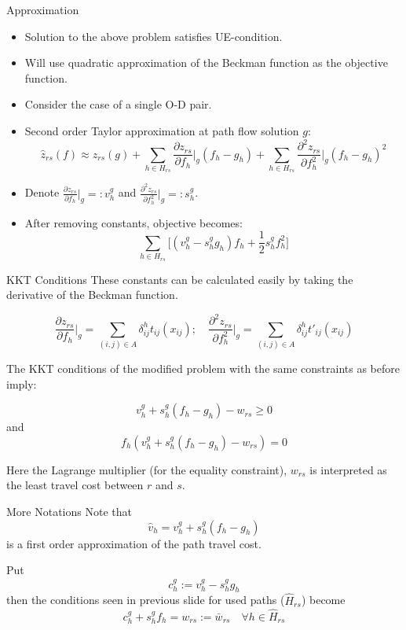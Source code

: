 \documentclass{beamer}
\begin{document}
\begin{frame}{Approximation}
\begin{itemize}
    \item Solution to the above problem satisfies
    UE-condition.
    
    \item Will use quadratic approximation of the
    Beckman function as the objective function.

    \item Consider the case of a single O-D pair.

    \item Second order Taylor approximation at path flow
    solution $g$:
    \[
        \hat{z}_{rs}(f) \approx z_{rs}(g) +
        \sum_{h\in H_{rs}}\frac{\partial z_{rs}}{\partial f_h}\bigg|_{g}
        (f_h-g_h)+
        \sum_{h\in H_{rs}} \frac{\partial ^2 z_{rs}}{\partial f_h^2}\bigg|_g(f_h-g_h)^2
    \]

    \item Denote $\frac{\partial z_{rs}}{\partial f_h}\big|_{g}=: v_h^g$ and
    $\frac{\partial ^2 z_{rs}}{\partial f_h^2}\big|_g =: s_h^g$.

    \item After removing constants, objective becomes:
    \[
        \sum_{h\in H_{rs}}\big[(v_h^g - s_h^g g_h)f_h + \frac{1}{2}
        s_h^g f_h^2\big]
    \]
\end{itemize}
\end{frame}

\begin{frame}{KKT Conditions}
These constants can be calculated easily by
taking the derivative of the Beckman function.

\[
\frac{\partial z_{rs}}{\partial f_h}\bigg|_{g}
= \sum_{(i,j)\in A}\delta_{ij}^h t_{ij}(x_{ij});\quad
\frac{\partial ^2 z_{rs}}{\partial f_h^2}\bigg|_g
= \sum_{(i,j)\in A} \delta_{ij}^h t'_{ij}(x_{ij})
\]

The KKT conditions of the modified problem with the
same constraints as before imply:

\[v_h^g + s_h^g(f_h-g_h) - w_{rs} \geq 0\]
and 
\[f_h(v_h^g + s_h^g(f_h-g_h) - w_{rs}) = 0\]

Here the Lagrange multiplier (for the equality constraint),
$w_{rs}$ is interpreted as the least travel cost between
$r$ and $s$.


\end{frame}

\begin{frame}{More Notations}
Note that
\[
\hat{v}_h = v_h^g + s_h^g(f_h-g_h)
\]
is a first order approximation of the path travel cost.

Put
\[
c_h^g := v_h^g - s_h^g g_h
\]
then the conditions seen in previous slide for used paths
($\hat{H}_{rs}$) become
\[
    c_h^g + s_h^g f_h = w_{rs} := \bar{w}_{rs} \quad \forall h\in\hat{H}_{rs}
\]
\end{frame}
\end{document}

